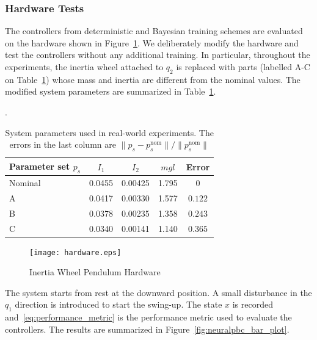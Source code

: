 \subsubsection{Hardware Tests} 

The controllers from deterministic and Bayesian training schemes are
evaluated on the hardware shown in Figure~\ref{fig:iwp_hardware}. 
%
We deliberately modify the hardware and test the controllers without any
additional training.
%
In particular, throughout the experiments, the inertia wheel attached to $q_2$
is replaced with parts (labelled A-C on Table~\ref{tab:modified_params}) whose
mass and inertia are different from the nominal values.
%
The modified system parameters are summarized in
Table~\ref{tab:modified_params}.
%
\begin{table}[H]
    \centering
    \caption{System parameters used in real-world experiments. The errors in the
    last column are $\|p_s - p^{\textrm{nom}}_{s}\| / \|p^{\textrm{nom}}_{s}\|$}.
    \begin{tabular}{lcccc}
    \toprule
    Parameter set $p_s$ & $I_1$ & $I_2$ & $mgl$ & Error \\
    \midrule
    Nominal & 0.0455 & 0.00425 & 1.795 & 0 \\
    A & 0.0417 & 0.00330 & 1.577 & $0.122$ \\
    B & 0.0378 & 0.00235 & 1.358 & $0.243$ \\
    C & 0.0340 & 0.00141 & 1.140 & $0.365$ \\
    \bottomrule
    \end{tabular}
    \label{tab:modified_params}
\end{table}
\begin{figure}[tb]
    \centering
    \texttt{[image: hardware.eps]}
    \caption{Inertia Wheel Pendulum Hardware}
    \label{fig:iwp_hardware}
\end{figure}

The system starts from rest at the downward position. 
%
A small disturbance in the $q_1$ direction is introduced to start the swing-up.
%
The state $x$ is recorded and~\eqref{eq:performance_metric} is the
performance metric used to evaluate the controllers. The results are
summarized in Figure~\ref{fig:neuralpbc_bar_plot}.
%

